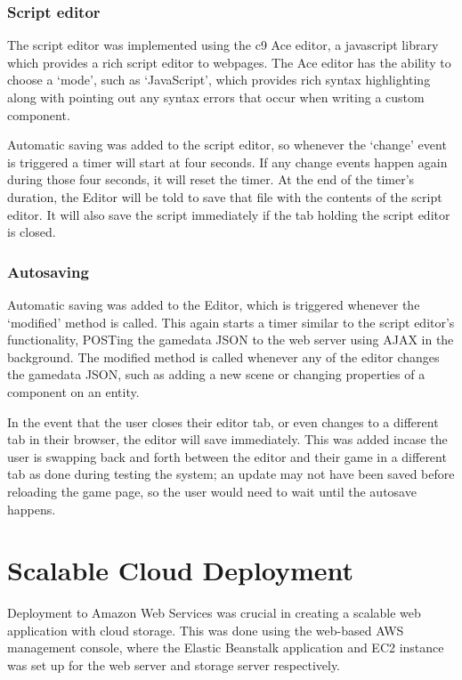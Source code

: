 	\subsubsection{Script editor}
	The script editor was implemented using the c9 Ace editor, a javascript library which provides a rich script editor to webpages. The Ace editor has the ability to choose a `mode', such as `JavaScript', which provides rich syntax highlighting along with pointing out any syntax errors that occur when writing a custom component.

	Automatic saving was added to the script editor, so whenever the `change' event is triggered a timer will start at four seconds. If any change events happen again during those four seconds, it will reset the timer. At the end of the timer's duration, the Editor will be told to save that file with the contents of the script editor. It will also save the script immediately if the tab holding the script editor is closed.

	\subsubsection{Autosaving}
	Automatic saving was added to the Editor, which is triggered whenever the `modified' method is called. This again starts a timer similar to the script editor's functionality, POSTing the gamedata JSON to the web server using AJAX in the background. The modified method is called whenever any of the editor changes the gamedata JSON, such as adding a new scene or changing properties of a component on an entity.

	In the event that the user closes their editor tab, or even changes to a different tab in their browser, the editor will save immediately. This was added incase the user is swapping back and forth between the editor and their game in a different tab as done during testing the system; an update may not have been saved before reloading the game page, so the user would need to wait until the autosave happens.

\section{Scalable Cloud Deployment}
Deployment to Amazon Web Services was crucial in creating a scalable web application with cloud storage. This was done using the web-based AWS management console, where the Elastic Beanstalk application and EC2 instance was set up for the web server and storage server respectively.

